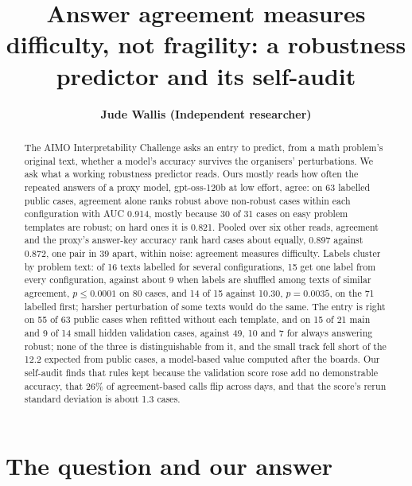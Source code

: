 \documentclass{article}
\title{Answer agreement measures difficulty, not fragility: a robustness predictor and its self-audit}
\author{\textbf{Jude Wallis (Independent researcher)}}
\begin{document}
\maketitle

\begin{abstract}
The AIMO Interpretability Challenge asks an entry to predict, from a math problem's original text, whether a model's
accuracy survives the organisers' perturbations. We ask what a working robustness predictor reads. Ours mostly reads how
often the repeated answers of a proxy model, gpt-oss-120b at low effort, agree: on 63 labelled public cases, agreement
alone ranks robust above non-robust cases within each configuration with AUC 0.914, mostly because 30 of 31 cases on
easy problem templates are robust; on hard ones it is 0.821. Pooled over six other reads, agreement and the proxy's
answer-key accuracy rank hard cases about equally, 0.897 against 0.872, one pair in 39 apart, within noise: agreement
measures difficulty. Labels cluster by problem text: of 16 texts labelled for several configurations, 15 get one label
from every configuration, against about 9 when labels are shuffled among texts of similar agreement, $p \leq 0.0001$ on
80 cases, and 14 of 15 against 10.30, $p = 0.0035$, on the 71 labelled first; harsher perturbation of some texts would do
the same. The entry is right on 55 of 63 public cases when refitted without each template, and on 15 of 21 main and 9
of 14 small hidden validation cases, against 49, 10 and 7 for always answering robust; none of the three is
distinguishable from it, and the small track fell short of the 12.2 expected from public cases, a model-based value
computed after the boards. Our self-audit finds that rules kept because the validation score rose add no demonstrable
accuracy, that 26\% of agreement-based calls flip across days, and that the score's rerun standard deviation is about
1.3 cases.
\end{abstract}

\begingroup
\renewcommand\thefootnote{}
\endgroup

\section{The question and our answer}
\label{sec:intro}
\end{document}
